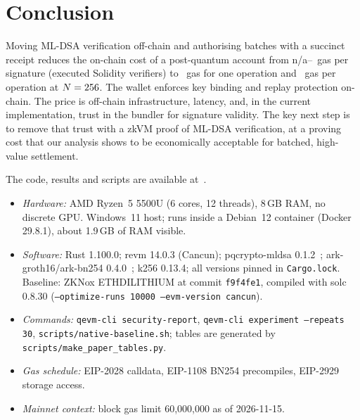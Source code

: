 \documentclass[conference]{IEEEtran}
\providecommand{\NativeExec}{n/a}
\begin{document}
\section{Conclusion}
Moving ML-DSA verification off-chain and authorising batches with a succinct receipt reduces the on-chain cost of a post-quantum account from \NativeExec--\NativeExecMain\ gas per signature (executed Solidity verifiers) to \SingleOpGas\ gas for one operation and \BatchMaxGas\ gas per operation at $N=256$. The wallet enforces key binding and replay protection on-chain. The price is off-chain infrastructure, latency, and, in the current implementation, trust in the bundler for signature validity. The key next step is to remove that trust with a zkVM proof of ML-DSA verification, at a proving cost that our analysis shows to be economically acceptable for batched, high-value settlement.

\appendix[Reproducibility]
The code, results and scripts are available at~\cite{qevmrepo}.
\begin{itemize}
\item \emph{Hardware:} AMD Ryzen~5 5500U (6 cores, 12 threads), 8\,GB RAM, no discrete GPU. Windows~11 host; runs inside a Debian~12 container (Docker 29.8.1), about 1.9\,GB of RAM visible.
\item \emph{Software:} Rust 1.100.0; revm 14.0.3 (Cancun); pqcrypto-mldsa 0.1.2~\cite{pqcryptomldsa}; ark-groth16/ark-bn254 0.4.0~\cite{arkworks}; k256 0.13.4; all versions pinned in \texttt{Cargo.lock}. Baseline: ZKNox ETHDILITHIUM at commit \texttt{f9f4fe1}, compiled with solc 0.8.30 (\texttt{--optimize-runs 10000 --evm-version cancun}).
\item \emph{Commands:} \texttt{qevm-cli security-report}, \texttt{qevm-cli experiment --repeats 30}, \texttt{scripts/native-baseline.sh}; tables are generated by \texttt{scripts/make\_paper\_tables.py}.
\item \emph{Gas schedule:} EIP-2028 calldata, EIP-1108 BN254 precompiles, EIP-2929 storage access.
\item \emph{Mainnet context:} block gas limit 60,000,000 as of 2026-11-15.
\end{itemize}



\end{document}
